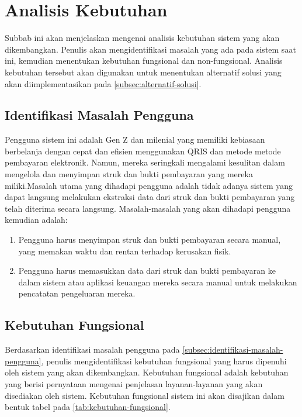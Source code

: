 \section{Analisis Kebutuhan}
\label{sec:analisis-kebutuhan}

Subbab ini akan menjelaskan mengenai analisis kebutuhan sistem yang akan dikembangkan. Penulis akan mengidentifikasi masalah yang ada pada sistem saat ini, kemudian menentukan kebutuhan fungsional dan non-fungsional. Analisis kebutuhan tersebut akan digunakan untuk menentukan alternatif solusi yang akan diimplementasikan pada \autoref{subsec:alternatif-solusi}.

\subsection{Identifikasi Masalah Pengguna}
\label{subsec:identifikasi-masalah-pengguna}
Pengguna sistem ini adalah Gen Z dan milenial yang memiliki kebiasaan berbelanja dengan cepat dan efisien menggunakan QRIS dan metode metode pembayaran elektronik. Namun, mereka seringkali mengalami kesulitan dalam mengelola dan menyimpan struk dan bukti pembayaran yang mereka miliki.Masalah utama yang dihadapi pengguna adalah tidak adanya sistem yang dapat langsung melakukan ekstraksi data dari struk dan bukti pembayaran yang telah diterima secara langsung. Masalah-masalah yang akan dihadapi pengguna kemudian adalah:
\begin{enumerate}
    \item Pengguna harus menyimpan struk dan bukti pembayaran secara manual, yang memakan waktu dan rentan terhadap kerusakan fisik.
    \item Pengguna harus memasukkan data dari struk dan bukti pembayaran ke dalam sistem atau aplikasi keuangan mereka secara manual untuk melakukan pencatatan pengeluaran mereka.
\end{enumerate}

\subsection{Kebutuhan Fungsional}
\label{subsec:kebutuhan-fungsional}
Berdasarkan identifikasi masalah pengguna pada \autoref{subsec:identifikasi-masalah-pengguna}, penulis mengidentifikasi kebutuhan fungsional yang harus dipenuhi oleh sistem yang akan dikembangkan. Kebutuhan fungsional adalah kebutuhan yang berisi pernyataan mengenai 
penjelasan layanan-layanan yang akan disediakan oleh sistem. Kebutuhan fungsional sistem ini akan disajikan dalam bentuk tabel pada \autoref{tab:kebutuhan-fungsional}.

